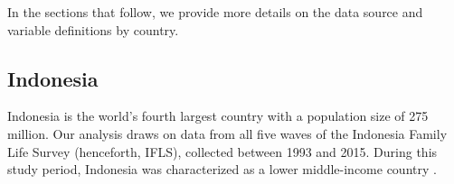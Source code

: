 In the sections that follow, we provide more details on the data source and variable definitions by country.

\subsection{Indonesia}\label{subsec:Indonesia-data}
Indonesia is the world's fourth largest country with a population size of 275 million. Our analysis draws on data from all five waves of the Indonesia Family Life Survey (henceforth, IFLS), collected between 1993 and 2015. During this study period, Indonesia was characterized as a lower middle-income country \citep{worldbank2024wdi}.

